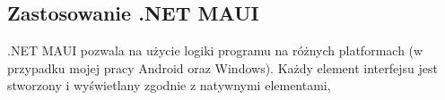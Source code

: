 \subsection{Zastosowanie .NET MAUI}

.NET MAUI pozwala na użycie logiki programu na różnych platformach (w przypadku mojej pracy Android oraz Windows).
Każdy element interfejsu jest stworzony i wyświetlany zgodnie z natywnymi elementami, 
